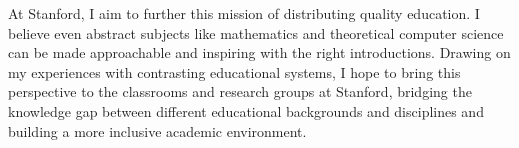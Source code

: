 \documentclass[12pt]{article}
\begin{document}
At Stanford, I aim to further this mission of distributing quality education. I believe even
abstract subjects like mathematics and theoretical computer science can be made approachable and
inspiring with the right introductions. Drawing on my experiences with contrasting educational
systems, I hope to bring this perspective to the classrooms and research groups at Stanford,
bridging the knowledge gap between different educational backgrounds and disciplines and building a
more inclusive academic environment. 

\newpage
\end{document}
